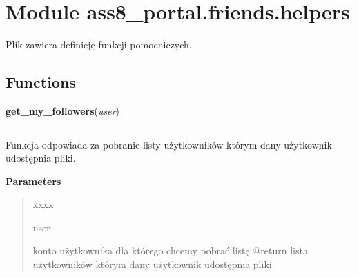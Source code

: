 %
%
%


\section{Module ass8\_portal.friends.helpers}

    \label{ass8_portal:friends:helpers}
Plik zawiera definicję funkcji pomocniczych.



  \subsection{Functions}

    \label{ass8_portal:friends:helpers:get_my_followers}

    \vspace{0.5ex}

\hspace{.8\funcindent}\begin{boxedminipage}{\funcwidth}

    \raggedright \textbf{get\_my\_followers}(\textit{user})

    \vspace{-1.5ex}

    \rule{\textwidth}{0.5\fboxrule}
\setlength{\parskip}{2ex}
    Funkcja odpowiada za pobranie listy użytkowników którym dany użytkownik
    udostępnia pliki.

\setlength{\parskip}{1ex}
      \textbf{Parameters}
      \vspace{-1ex}

      \begin{quote}
        \begin{Ventry}{xxxx}

          \item[user]

          konto użytkownika dla którego chcemy pobrać listę @return lista 
          użytkowników którym dany użytkownik udostępnia pliki

        \end{Ventry}

      \end{quote}

    \end{boxedminipage}

